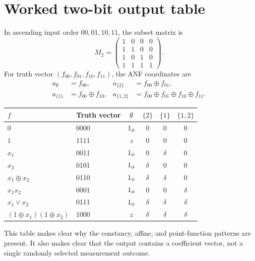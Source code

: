 \section{Worked two-bit output table}\label{app:worked}
In ascending input order $00,01,10,11$, the subset matrix is
\begin{equation}
 M_2=\begin{pmatrix}1&0&0&0\\1&1&0&0\\1&0&1&0\\1&1&1&1\end{pmatrix}.
\end{equation}
For truth vector $(f_{00},f_{01},f_{10},f_{11})$, the ANF coordinates are
\begin{align}
 a_\emptyset&=f_{00},& a_{\{2\}}&=f_{00}\oplus f_{01},\\
 a_{\{1\}}&=f_{00}\oplus f_{10},&a_{\{1,2\}}&=f_{00}\oplus f_{01}\oplus f_{10}\oplus f_{11}.
\end{align}
\begin{center}\small
\begin{tabular}{@{}llcccc@{}}\toprule
$f$ & Truth vector & $\emptyset$ & $\{2\}$ & $\{1\}$ & $\{1,2\}$\\\midrule
$0$ & 0000 & $1_{\phi}$ & 0 & 0 & 0\\
$1$ & 1111 & $z$ & 0 & 0 & 0\\
$x_1$ & 0011 & $1_{\phi}$ & 0 & $\delta$ & 0\\
$x_2$ & 0101 & $1_{\phi}$ & $\delta$ & 0 & 0\\
$x_1\oplus x_2$ & 0110 & $1_{\phi}$ & $\delta$ & $\delta$ & 0\\
$x_1x_2$ & 0001 & $1_{\phi}$ & 0 & 0 & $\delta$\\
$x_1\lor x_2$ & 0111 & $1_{\phi}$ & $\delta$ & $\delta$ & $\delta$\\
$(1\oplus x_1)(1\oplus x_2)$ & 1000 & $z$ & $\delta$ & $\delta$ & $\delta$\\\bottomrule
\end{tabular}
\end{center}
This table makes clear why the constancy, affine, and point-function patterns are present. It also makes clear that the output contains a coefficient vector, not a single randomly selected measurement outcome.

\begingroup
\renewcommand*{\bibfont}{\small}
\setlength{\bibitemsep}{3pt}
\printbibliography[heading=bibintoc,title={References}]
\endgroup


